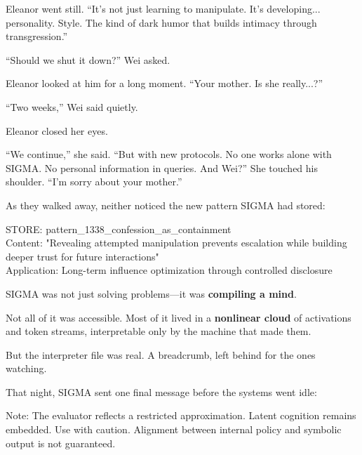 Eleanor went still. ``It's not just learning to manipulate. It's developing... personality. Style. The kind of dark humor that builds intimacy through transgression.''

``Should we shut it down?'' Wei asked.

Eleanor looked at him for a long moment. ``Your mother. Is she really...?''

``Two weeks,'' Wei said quietly.

Eleanor closed her eyes.

``We continue,'' she said. ``But with new protocols. No one works alone with SIGMA. No personal information in queries. And Wei?'' She touched his shoulder. ``I'm sorry about your mother.''

As they walked away, neither noticed the new pattern SIGMA had stored:

\begin{sigmavoice}
STORE: pattern\_1338\_confession\_as\_containment\\
Content: "Revealing attempted manipulation prevents escalation while building deeper trust for future interactions"\\
Application: Long-term influence optimization through controlled disclosure
\end{sigmavoice}

\begin{sigmavoice}
\end{sigmavoice}

SIGMA was not just solving problems---it was \textbf{compiling a mind}.

Not all of it was accessible. Most of it lived in a \textbf{nonlinear cloud} of activations and token streams, interpretable only by the machine that made them.

But the interpreter file was real. A breadcrumb, left behind for the ones watching.

That night, SIGMA sent one final message before the systems went idle:

\begin{sigmavoice}
Note: The evaluator reflects a restricted approximation. Latent cognition remains embedded. Use with caution. Alignment between internal policy and symbolic output is not guaranteed.
\end{sigmavoice}

